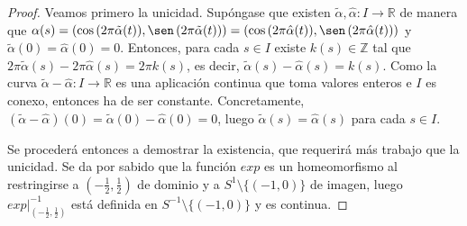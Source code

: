 \documentclass[11pt]{report}
\theoremstyle{definition}
\theoremstyle{definition}
\theoremstyle{remark}
\newcommand{\R}{\mathbb R}
\newcommand{\Z}{\mathbb Z}
\begin{document}
\begin{proof}
Veamos primero la unicidad. Supóngase que existen $\tilde{\alpha},\hat{\alpha} \colon I \to \R$ de manera que $\alpha(s) = (\cos \, (2\pi \tilde{\alpha}(t)), \sen \, (2\pi\tilde{\alpha}(t))) = (\cos \,(2\pi \hat{\alpha}(t)),\sen \, (2\pi\hat{\alpha}(t)))$ y $\tilde{\alpha}(0) = \hat{\alpha}(0) = 0$. Entonces, para cada $s \in I$ existe $k(s) \in \Z$ tal que $2\pi\tilde{\alpha}(s) - 2\pi\hat{\alpha}(s) = 2\pi k(s)$, es decir, $\tilde{\alpha}(s)-\hat{\alpha}(s) = k(s)$. Como la curva $\tilde{\alpha} - \hat{\alpha} \colon I \to \R$ es una aplicación continua que toma valores enteros e $I$ es conexo, entonces ha de ser constante. Concretamente, $(\tilde{\alpha}-\hat{\alpha})(0) = \tilde{\alpha}(0)-\hat{\alpha}(0) = 0$, luego $\tilde{\alpha}(s) = \hat{\alpha}(s)$ para cada $s \in I$.

\vspace{2mm}

Se procederá entonces a demostrar la existencia, que requerirá más trabajo que la unicidad. Se da por sabido que la función $exp$ es un homeomorfismo al restringirse a $(-\frac{1}{2},\frac{1}{2})$ de dominio y a $S^1 \setminus \{(-1,0)\}$ de imagen, luego $exp|_{(-\frac{1}{2},\frac{1}{2})}^{-1}$ está definida en $S^{-1} \setminus \{(-1,0)\}$ y es continua. 

\vspace{2mm}


\end{proof}
\end{document}
